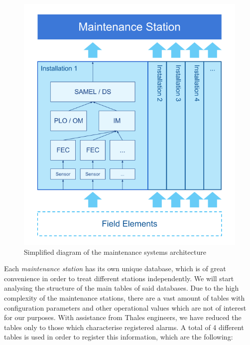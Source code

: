 \begin{figure}[hbt]
\includegraphics[width=\textwidth]{./img/arch_stations.png}
\caption{Simplified diagram of the maintenance systems architecture} \label{fig:arch_stations}
\end{figure}

Each \emph{maintenance station} has its own unique database, which is of great convenience in order to treat different stations independently. We will start analysing the structure of the main tables of said databases. Due to the high complexity of the maintenance stations, there are a vast amount of tables with configuration parameters and other operational values which are not of interest for our purposes. With assistance from Thales engineers, we have reduced the tables only to those which characterise registered alarms. A total of 4 different tables is used in order to register this information, which are the following:

